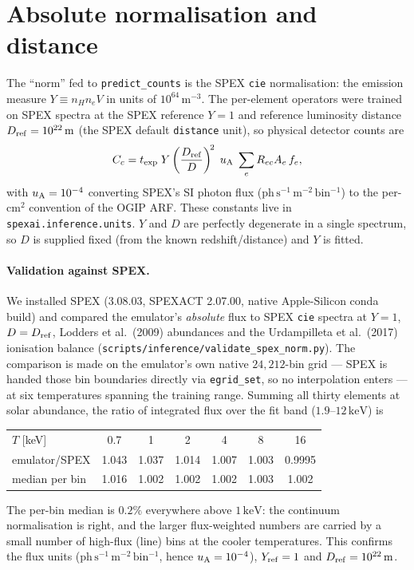 \documentclass[11pt,a4paper]{article}
\newcommand{\kev}{\,\mathrm{keV}}
\newcommand{\code}[1]{\texttt{#1}}
\begin{document}
\section{Absolute normalisation and distance}
The ``norm'' fed to \code{predict\_counts} is the SPEX \code{cie} normalisation:
the emission measure $Y \equiv n_H n_e V$ in units of $10^{64}\,\mathrm{m^{-3}}$.
The per-element operators were trained on SPEX spectra at the SPEX reference
$Y=1$ and reference luminosity distance $D_{\rm ref}=10^{22}\,\mathrm{m}$ (the
SPEX default \code{distance} unit), so physical detector counts are
\begin{equation}
C_c = t_{\rm exp}\; Y \left(\frac{D_{\rm ref}}{D}\right)^{\!2}
      \; u_{\rm A}\; \sum_e R_{ec} A_e\, f_e ,
\end{equation}
with $u_{\rm A}=10^{-4}$ converting SPEX's SI photon flux
($\mathrm{ph\,s^{-1}\,m^{-2}\,bin^{-1}}$) to the per-$\mathrm{cm^2}$ convention of
the OGIP ARF. These constants live in \code{spexai.inference.units}. $Y$ and $D$
are perfectly degenerate in a single spectrum, so $D$ is supplied fixed (from the
known redshift/distance) and $Y$ is fitted.

\paragraph{Validation against SPEX.} We installed SPEX (3.08.03, SPEXACT
2.07.00, native Apple-Silicon conda build) and compared the emulator's
\emph{absolute} flux to SPEX \code{cie} spectra at $Y=1$, $D=D_{\rm ref}$,
Lodders et al.\ (2009) abundances and the Urdampilleta et al.\ (2017)
ionisation balance (\code{scripts/inference/validate\_spex\_norm.py}). The
comparison is made on the emulator's own native $24{,}212$-bin grid --- SPEX is
handed those bin boundaries directly via \code{egrid\_set}, so no interpolation
enters --- at six temperatures spanning the training range. Summing all thirty
elements at solar abundance, the ratio of integrated flux over the fit band
($1.9$--$12\kev$) is
\begin{center}
\begin{tabular}{lcccccc}
\hline
$T$ [keV] & 0.7 & 1 & 2 & 4 & 8 & 16 \\
emulator/SPEX & 1.043 & 1.037 & 1.014 & 1.007 & 1.003 & 0.9995 \\
median per bin & 1.016 & 1.002 & 1.002 & 1.002 & 1.003 & 1.002 \\
\hline
\end{tabular}
\end{center}
The per-bin median is $0.2\%$ everywhere above $1\kev$: the continuum
normalisation is right, and the larger flux-weighted numbers are carried by a
small number of high-flux (line) bins at the cooler temperatures. This confirms
the flux units ($\mathrm{ph\,s^{-1}\,m^{-2}\,bin^{-1}}$, hence $u_{\rm
A}=10^{-4}$), $Y_{\rm ref}=1$ and $D_{\rm ref}=10^{22}\,\mathrm{m}$.
\end{document}

